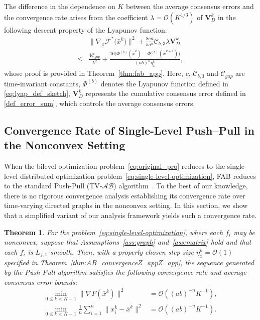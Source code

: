 \documentclass{article}
\theoremstyle{plain}
\newtheorem{theorem}{Theorem}[section]
\theoremstyle{definition}
\theoremstyle{remark}
\begin{document}
The difference in the dependence on $K$ between the average consensus errors and the convergence rate arises from the coefficient $\lambda= \mathcal{O}(K^{1/3})$ of $\mathbf{V}_{D}^{k}$ in the following descent property of the Lyapunov
function: 
\begin{equation}
\begin{aligned}
&\big\|\nabla_{x} \mathcal{F}^{*}\big({\bar{x}}^k\big) \big\|^{2} +\frac{8\underline{c} n}{5 a^n}\mathcal{C}_{b,3}\lambda  \mathbf{V}_{D}^{k}\\
    \leq & \frac{4\mathcal{C}_{gap}}{\lambda^{2}} + \frac{16\big(\Phi^{(b)}({\hat{x}}^{k}) - \Phi^{(b)}({\hat{x}}^{k+1}) \big)}{(ab)^{n}\eta_{x}^{k}} ,
\end{aligned}
\end{equation}
whose proof is provided in Theorem~\ref{thm:fab_app}.
Here, $\underline{c}$, $\mathcal{C}_{b,3}$ and $\mathcal{C}_{gap}$ are time-invariant constants, $\Phi^{(b)}$ denotes the Lyapunov function defined in \eqref{eq:lyap_def_sketch}, $\mathbf{V}_{D}^{k}$ represents the cumulative consensus error defined in \eqref{def_error_sum}, which controls the average consensus errors.


\subsection{Convergence Rate of Single-Level Push–Pull in the Nonconvex Setting}

When the bilevel optimization problem~\eqref{eq:original_pro} reduces to the single-level distributed optimization problem~\eqref{eq:single-level-optimization}, FAB reduces to the standard Push-Pull (TV-$\mathcal{AB}$) algorithm~\cite{Usman2020tv,Nedic2025tvd}. To the best of our knowledge, there is no rigorous convergence analysis establishing its convergence rate over time-varying directed graphs in the nonconvex setting. 
In this section, we show that a simplified variant of our analysis framework yields such a convergence rate. 

\begin{theorem}
\label{thm:AB_convergence}
    For the problem~\eqref{eq:single-level-optimization}, where each $f_{i}$ may be nonconvex, suppose that Assumptions~\ref{ass:graph} and~\ref{ass:matrix} hold and that each $f_{i}$ is $L_{f,1}$-smooth. Then, with a properly chosen step size $\eta_{x}^k = \mathcal{O}(1)$ specified in Theorem~\ref{thm:AB_convergenceZ_appZ_app}, the sequence generated by the Push-Pull algorithm satisfies the following convergence rate and average consensus error bounds: 
    \begin{subequations}
    \begin{align}
        \min_{0 \le k < K-1} \|\nabla F(\bar{x}^k)\|^2 &= \mathcal{O}\left( (ab)^{-n} K^{-1} \right), \label{eq:grad_conv} \\
        \min_{0 \le k < K-1} \frac{1}{n}\sum_{i=1}^{n} \|x_{i}^{k} - \bar{x}^k\|^2 &= \mathcal{O}\left( (ab)^{-n} K^{-1} \right).
        \label{eq:cons_conv}
    \end{align}
    \end{subequations}
\end{theorem}
\end{document}

